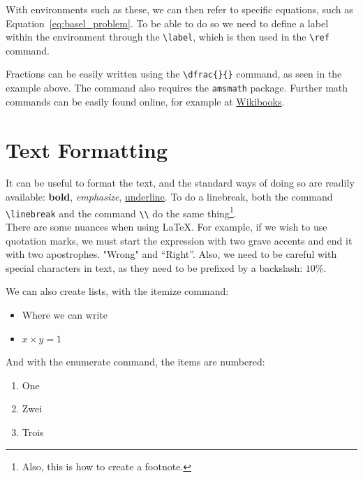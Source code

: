 \documentclass[10pt]{article}
\begin{document}
With environments such as these, we can then refer to specific equations, such as Equation~\ref{eq:basel_problem}.
To be able to do so we need to define a label within the environment through the \verb|\label|, which is then used in the \verb|\ref| command.


Fractions can be easily written using the \verb|\dfrac{}{}| command, as seen in the example above. The command also requires the \verb|amsmath| package. Further math commands can be easily found online, for example at \href{https://en.wikibooks.org/wiki/LaTeX/Mathematics}{Wikibooks}. 


\section{Text Formatting}
\label{sec:text_format}

It can be useful to format the text, and the standard ways of doing so are readily available: \textbf{bold}, \emph{emphasize}, \underline{underline}. To do a linebreak, both the command \verb|\linebreak| and the command \verb|\\| do the same thing\footnote{Also, this is how to create a footnote.}.\\
There are some nuances when using \LaTeX. For example, if we wish to use quotation marks, we must start the expression with two grave accents and end it with two apostrophes. "Wrong" and ``Right''. Also, we need to be careful with special characters in text, as they need to be prefixed by a backslash: $10\%$.

We can also create lists, with the itemize command:

\begin{itemize}
    \item Where we can write
    \item $x\times y = 1$
\end{itemize}

And with the enumerate command, the items are numbered:

\begin{enumerate}
    \item One
    \item Zwei
    \item Trois
\end{enumerate}

\end{document}
